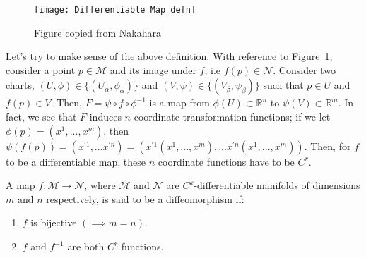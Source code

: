     \begin{figure}[h]
      \centering
      \texttt{[image: Differentiable Map defn]}
      \caption[]{Figure copied from Nakahara}
      \label{fig: differentiable map defn}
    \end{figure}
    Let's try to make sense of the above definition. With reference to
    Figure~\ref{fig: differentiable map defn}, consider a point $p\in
    \mathcal{M}$ and its image under $f$, i.e $f(p) \in \mathcal{N}$.
    Consider two charts, $(U,\phi) \in \{(U_\alpha, \phi_\alpha)\}$ and
    $(V,\psi) \in \{(V_\beta, \psi_\beta)\}$ such that $p \in U$ and $f(p)
    \in V$. Then, $F = \psi \circ f \circ \phi^{-1}$ is a map from $\phi(U)
    \subset \mathbb{R}^n$ to $\psi(V)\subset \mathbb{R}^m$. In fact, we see
    that $F$ induces $n$ coordinate transformation functions; if we let
    $\phi(p) = \left(x^1,...,x^m\right)$, then $\psi(f(p)) =
    \left(x^{\prime 1},...x^{\prime n}\right) = \left(x^{\prime
    1}(x^1,...,x^m),...x^{\prime n}(x^1,...,x^m)\right)$. Then, for $f$ to be a differentiable map, these $n$ coordinate functions have to be $C^r$.
    \begin{definition}[Diffeomorphism]
      A map $f:\mathcal{M} \rightarrow \mathcal{N}$, where $\mathcal{M}$ and
      $\mathcal{N}$ are $C^k$-differentiable manifolds of dimensions $m$ and
      $n$ respectively, is said to be a diffeomorphism if:
      \begin{enumerate}
        \item{$f$ is bijective $(\implies m = n)$.}
        \item{$f$ and $f^{-1}$ are both $C^r$ functions.}
      \end{enumerate}
    \end{definition}